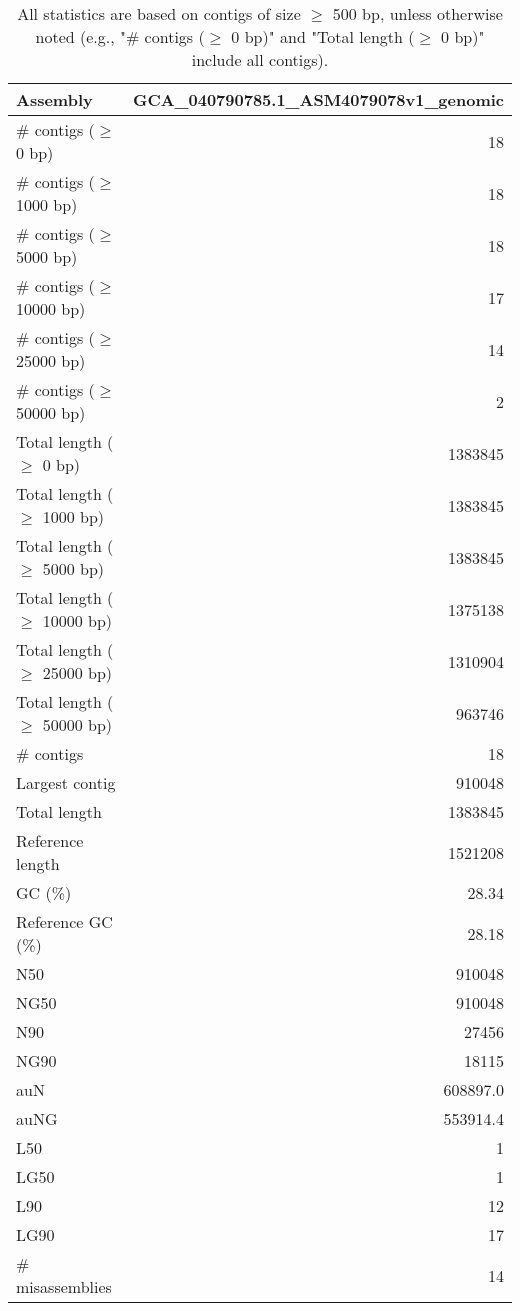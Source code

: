\documentclass[12pt,a4paper]{article}
\begin{document}
\begin{table}[ht]
\begin{center}
\caption{All statistics are based on contigs of size $\geq$ 500 bp, unless otherwise noted (e.g., "\# contigs ($\geq$ 0 bp)" and "Total length ($\geq$ 0 bp)" include all contigs).}
\begin{tabular}{|l*{1}{|r}|}
\hline
Assembly & GCA\_040790785.1\_ASM4079078v1\_genomic \\ \hline
\# contigs ($\geq$ 0 bp) & 18 \\ \hline
\# contigs ($\geq$ 1000 bp) & 18 \\ \hline
\# contigs ($\geq$ 5000 bp) & 18 \\ \hline
\# contigs ($\geq$ 10000 bp) & 17 \\ \hline
\# contigs ($\geq$ 25000 bp) & 14 \\ \hline
\# contigs ($\geq$ 50000 bp) & 2 \\ \hline
Total length ($\geq$ 0 bp) & 1383845 \\ \hline
Total length ($\geq$ 1000 bp) & 1383845 \\ \hline
Total length ($\geq$ 5000 bp) & 1383845 \\ \hline
Total length ($\geq$ 10000 bp) & 1375138 \\ \hline
Total length ($\geq$ 25000 bp) & 1310904 \\ \hline
Total length ($\geq$ 50000 bp) & 963746 \\ \hline
\# contigs & 18 \\ \hline
Largest contig & 910048 \\ \hline
Total length & 1383845 \\ \hline
Reference length & 1521208 \\ \hline
GC (\%) & 28.34 \\ \hline
Reference GC (\%) & 28.18 \\ \hline
N50 & 910048 \\ \hline
NG50 & 910048 \\ \hline
N90 & 27456 \\ \hline
NG90 & 18115 \\ \hline
auN & 608897.0 \\ \hline
auNG & 553914.4 \\ \hline
L50 & 1 \\ \hline
LG50 & 1 \\ \hline
L90 & 12 \\ \hline
LG90 & 17 \\ \hline
\# misassemblies & 14 \\ \hline

\end{tabular}
\end{center}
\end{table}
\end{document}
